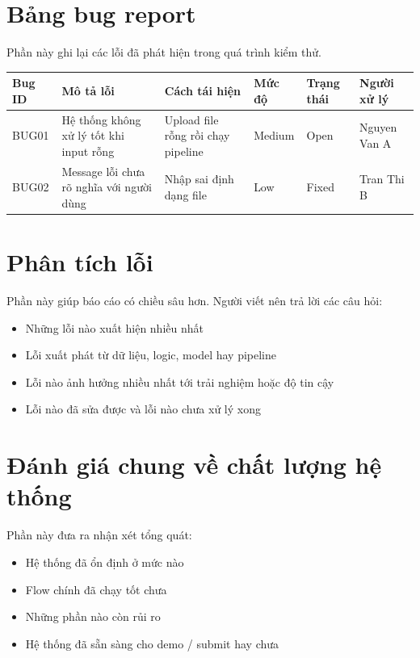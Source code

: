 \documentclass[12pt]{ai_conquer2026}
\begin{document}
\section{Bảng bug report}

Phần này ghi lại các lỗi đã phát hiện trong quá trình kiểm thử.

\begin{longtable}{|p{1.2cm}|p{2.6cm}|p{3.3cm}|p{2.2cm}|p{2.2cm}|p{2cm}|}
\hline
\textbf{Bug ID} & \textbf{Mô tả lỗi} & \textbf{Cách tái hiện} & \textbf{Mức độ} & \textbf{Trạng thái} & \textbf{Người xử lý} \\
\hline
BUG01 & Hệ thống không xử lý tốt khi input rỗng & Upload file rỗng rồi chạy pipeline & Medium & Open & Nguyen Van A \\
\hline
BUG02 & Message lỗi chưa rõ nghĩa với người dùng & Nhập sai định dạng file & Low & Fixed & Tran Thi B \\
\hline
\end{longtable}

\section{Phân tích lỗi}

Phần này giúp báo cáo có chiều sâu hơn. Người viết nên trả lời các câu hỏi:
\begin{itemize}
    \item Những lỗi nào xuất hiện nhiều nhất
    \item Lỗi xuất phát từ dữ liệu, logic, model hay pipeline
    \item Lỗi nào ảnh hưởng nhiều nhất tới trải nghiệm hoặc độ tin cậy
    \item Lỗi nào đã sửa được và lỗi nào chưa xử lý xong
\end{itemize}

\section{Đánh giá chung về chất lượng hệ thống}

Phần này đưa ra nhận xét tổng quát:
\begin{itemize}
    \item Hệ thống đã ổn định ở mức nào
    \item Flow chính đã chạy tốt chưa
    \item Những phần nào còn rủi ro
    \item Hệ thống đã sẵn sàng cho demo / submit hay chưa
\end{itemize}
\end{document}
